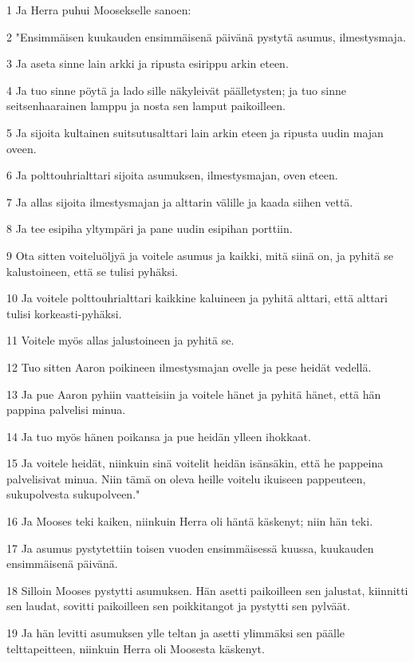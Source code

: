 \par 1 Ja Herra puhui Moosekselle sanoen:
\par 2 "Ensimmäisen kuukauden ensimmäisenä päivänä pystytä asumus, ilmestysmaja.
\par 3 Ja aseta sinne lain arkki ja ripusta esirippu arkin eteen.
\par 4 Ja tuo sinne pöytä ja lado sille näkyleivät päälletysten; ja tuo sinne seitsenhaarainen lamppu ja nosta sen lamput paikoilleen.
\par 5 Ja sijoita kultainen suitsutusalttari lain arkin eteen ja ripusta uudin majan oveen.
\par 6 Ja polttouhrialttari sijoita asumuksen, ilmestysmajan, oven eteen.
\par 7 Ja allas sijoita ilmestysmajan ja alttarin välille ja kaada siihen vettä.
\par 8 Ja tee esipiha yltympäri ja pane uudin esipihan porttiin.
\par 9 Ota sitten voiteluöljyä ja voitele asumus ja kaikki, mitä siinä on, ja pyhitä se kalustoineen, että se tulisi pyhäksi.
\par 10 Ja voitele polttouhrialttari kaikkine kaluineen ja pyhitä alttari, että alttari tulisi korkeasti-pyhäksi.
\par 11 Voitele myös allas jalustoineen ja pyhitä se.
\par 12 Tuo sitten Aaron poikineen ilmestysmajan ovelle ja pese heidät vedellä.
\par 13 Ja pue Aaron pyhiin vaatteisiin ja voitele hänet ja pyhitä hänet, että hän pappina palvelisi minua.
\par 14 Ja tuo myös hänen poikansa ja pue heidän ylleen ihokkaat.
\par 15 Ja voitele heidät, niinkuin sinä voitelit heidän isänsäkin, että he pappeina palvelisivat minua. Niin tämä on oleva heille voitelu ikuiseen pappeuteen, sukupolvesta sukupolveen."
\par 16 Ja Mooses teki kaiken, niinkuin Herra oli häntä käskenyt; niin hän teki.
\par 17 Ja asumus pystytettiin toisen vuoden ensimmäisessä kuussa, kuukauden ensimmäisenä päivänä.
\par 18 Silloin Mooses pystytti asumuksen. Hän asetti paikoilleen sen jalustat, kiinnitti sen laudat, sovitti paikoilleen sen poikkitangot ja pystytti sen pylväät.
\par 19 Ja hän levitti asumuksen ylle teltan ja asetti ylimmäksi sen päälle telttapeitteen, niinkuin Herra oli Moosesta käskenyt.
